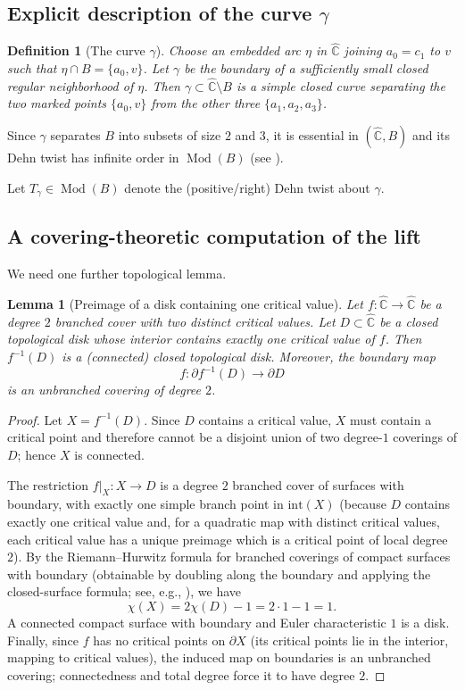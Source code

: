 \documentclass[11pt]{article}
\newtheorem{lemma}[theorem]{Lemma}
\newtheorem{definition}[theorem]{Definition}
\DeclareMathOperator{\Mod}{Mod}
\begin{document}
\subsection{Explicit description of the curve $\gamma$}
\begin{definition}[The curve $\gamma$]\label{def:gamma}
Choose an embedded arc $\eta$ in $\widehat{\mathbb C}$ joining $a_0=c_1$ to $v$ such that $\eta\cap B=\{a_0,v\}$. Let $\gamma$ be the boundary of a sufficiently small closed regular neighborhood of $\eta$. Then $\gamma\subset \widehat{\mathbb C}\setminus B$ is a simple closed curve separating the two marked points $\{a_0,v\}$ from the other three $\{a_1,a_2,a_3\}$.
\end{definition}

Since $\gamma$ separates $B$ into subsets of size $2$ and $3$, it is essential in $(\widehat{\mathbb C},B)$ and its Dehn twist has infinite order in $\Mod(B)$ (see \cite[\S3.3]{FM12}).

Let $T_\gamma\in \Mod(B)$ denote the (positive/right) Dehn twist about $\gamma$.

\subsection{A covering-theoretic computation of the lift}
We need one further topological lemma.

\begin{lemma}[Preimage of a disk containing one critical value]\label{lem:disk-preimage}
Let $f:\widehat{\mathbb C}\to \widehat{\mathbb C}$ be a degree $2$ branched cover with two distinct critical values. Let $D\subset \widehat{\mathbb C}$ be a closed topological disk whose interior contains exactly one critical value of $f$. Then $f^{-1}(D)$ is a (connected) closed topological disk. Moreover, the boundary map
\[
f:\partial f^{-1}(D)\longrightarrow \partial D
\]
is an unbranched covering of degree $2$.
\end{lemma}

\begin{proof}
Let $X=f^{-1}(D)$. Since $D$ contains a critical value, $X$ must contain a critical point and therefore cannot be a disjoint union of two degree-$1$ coverings of $D$; hence $X$ is connected.

The restriction $f|_X:X\to D$ is a degree $2$ branched cover of surfaces with boundary, with exactly one simple branch point in $\mathrm{int}(X)$ (because $D$ contains exactly one critical value and, for a quadratic map with distinct critical values, each critical value has a unique preimage which is a critical point of local degree $2$). By the Riemann--Hurwitz formula for branched coverings of compact surfaces with boundary (obtainable by doubling along the boundary and applying the closed-surface formula; see, e.g., \cite[Ch.~1]{Miranda95}), we have
\[
\chi(X)=2\chi(D)-1=2\cdot 1-1=1.
\]
A connected compact surface with boundary and Euler characteristic $1$ is a disk. Finally, since $f$ has no critical points on $\partial X$ (its critical points lie in the interior, mapping to critical values), the induced map on boundaries is an unbranched covering; connectedness and total degree force it to have degree $2$.
\end{proof}
\end{document}
